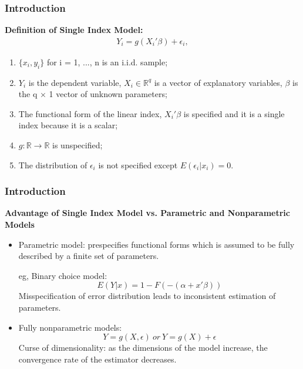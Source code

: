 \documentclass{beamer}
\begin{document}
\begin{frame}[t]
    \frametitle{Introduction}
	 \textbf{Definition of Single Index Model:}  
	 \begin{eqnarray}
		Y_i = g(X_i'\beta) + \epsilon_i,  %
 	 \end{eqnarray}

		\begin{enumerate}
			\item $\{x_i,y_i\}$ for i = 1, ..., n is an i.i.d. sample;
			\item $Y_i$ is the dependent variable, $X_i\in \mathbb{R}^{q}$ is a vector of explanatory variables, $\beta$ is the q $\times$ 1 						vector of unknown parameters; 
			\item The functional form of the linear index, $X_i'\beta$ is specified and it is a single index because it is a scalar;
			\item $g: \mathbb{R} \rightarrow \mathbb{R} $ is unspecified; %
			\item The distribution of $\epsilon_i$ is not specified except $ E(\epsilon_i|x_i) = 0 $.
	   \end{enumerate}

\note{~}      
\end{frame}

\begin{frame}[t]
	\frametitle{Introduction}
	\textbf{Advantage of Single Index Model vs. Parametric and Nonparametric Models}
	\begin{itemize}
	\item Parametric model: prespecifies functional forms which is assumed to be fully described by a finite set of parameters.
			
			eg, Binary choice model: 
			\[E(Y|x) = 1 - F(-(\alpha + x'\beta))\]
			Misspecification of error distribution leads to inconsistent estimation of parameters.
			
	\item Fully nonparametric models: \[Y = g(X, \epsilon)\ or\ Y = g(X) + \epsilon\]
	      Curse of dimensionality: as the dimensions of the model increase, the convergence rate of the estimator decreases.
	
	\end{itemize}
	

\note{~}
\end{frame}
\end{document}
